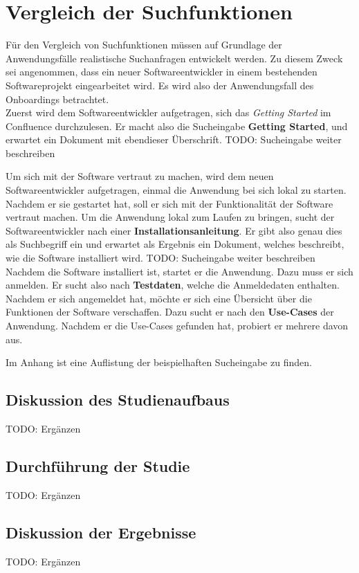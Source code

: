 \chapter{Vergleich der Suchfunktionen}
Für den Vergleich von Suchfunktionen müssen auf Grundlage der Anwendungsfälle realistische Suchanfragen entwickelt werden.
Zu diesem Zweck sei angenommen, dass ein neuer Softwareentwickler in einem bestehenden Softwareprojekt eingearbeitet wird.
Es wird also der Anwendungsfall des Onboardings betrachtet.\\

Zuerst wird dem Softwareentwickler aufgetragen, sich das \textit{Getting Started} im Confluence durchzulesen.
Er macht also die Sucheingabe \textbf{Getting Started}, und erwartet ein Dokument mit ebendieser Überschrift. 
TODO: Sucheingabe weiter beschreiben

Um sich mit der Software vertraut zu machen, wird dem neuen Softwareentwickler aufgetragen, einmal die Anwendung bei sich lokal zu starten.
Nachdem er sie gestartet hat, soll er sich mit der Funktionalität der Software vertraut machen.
Um die Anwendung lokal zum Laufen zu bringen, sucht der Softwareentwickler nach einer \textbf{Installationsanleitung}.
Er gibt also genau dies als Suchbegriff ein und erwartet als Ergebnis ein Dokument, welches beschreibt, wie die Software installiert wird.
TODO: Sucheingabe weiter beschreiben\\

Nachdem die Software installiert ist, startet er die Anwendung.
Dazu muss er sich anmelden.
Er sucht also nach \textbf{Testdaten}, welche die Anmeldedaten enthalten.
Nachdem er sich angemeldet hat, möchte er sich eine Übersicht über die Funktionen der Software verschaffen.
Dazu sucht er nach den \textbf{Use-Cases} der Anwendung.
Nachdem er die Use-Cases gefunden hat, probiert er mehrere davon aus.

Im Anhang ist eine Auflistung der beispielhaften Sucheingabe zu finden.

\section{Diskussion des Studienaufbaus}
TODO: Ergänzen

\section{Durchführung der Studie}
TODO: Ergänzen

\section{Diskussion der Ergebnisse}
TODO: Ergänzen
